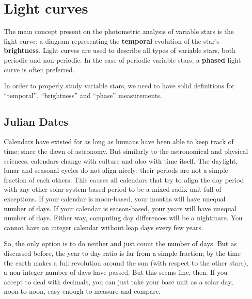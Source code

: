 \section{Light curves}

The main concept present on the photometric analysis of variable stars is the light curve:
a diagram representing the \textbf{temporal} evolution of the star's \textbf{brightness}. 
Light curves are used to describe all types of variable stars, both periodic and non-periodic. 
In the case of periodic variable stars, a \textbf{phased} light curve is often preferred.

In order to properly study variable stars, we need to have solid definitions for \enquote{temporal}, 
\enquote{brightness} and \enquote{phase} measurements.

\subsection{Julian Dates}
	
	
	Calendars have existed for as long as humans have been able to keep track of time; since the dawn of astronomy.
	But similarly to the astronomical and physical sciences, calendars change with culture and also with time itself.
	The daylight, lunar and seasonal cycles do not align nicely; their periods are not a simple fraction of each others.
	This causes all calendars that try to align the day period with any other solar system based period to be a mixed radix unit full of exceptions.
	If your calendar is moon-based, your months will have unequal number of days.
	If your calendar is season-based, your years will have unequal number of days.
	Either way, computing day differences will be a nightmare. 
	You cannot have an integer calendar without leap days every few years.
	
	
	So, the only option is to do neither and just count the number of days. 
	But as discussed before, the year to day ratio is far from a simple fraction;
	by the time the earth makes a full revolution around the sun (with respect to the other stars),	a non-integer number of days have passed.
	But this seems fine, then. If you accept to deal with decimals, you can just take your base unit as a solar day, noon to noon,
	easy enough to measure and compare.
	
	
